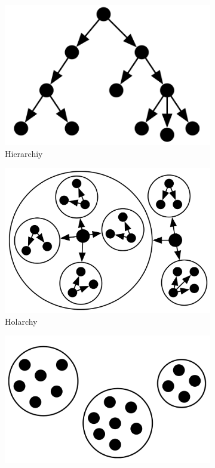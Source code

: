 \begin{figure}
    \begin{subfigure}[h]{0.3\linewidth}
        \includegraphics[width=\textwidth]{images/orgs/org-hierarchy.png}
        \caption{Hierarchiy}
        \label{fig:hierarchy}
    \end{subfigure}
    \begin{subfigure}[h]{0.3\linewidth}
        \includegraphics[width=\textwidth]{images/orgs/org-holarchy.png}
        \caption{Holarchy}
        \label{fig:holarchy}
    \end{subfigure}
    \begin{subfigure}[h]{0.3\linewidth}
        \includegraphics[width=\textwidth]{images/orgs/org-coalitions.png}

\end{subfigure}
\end{figure}
